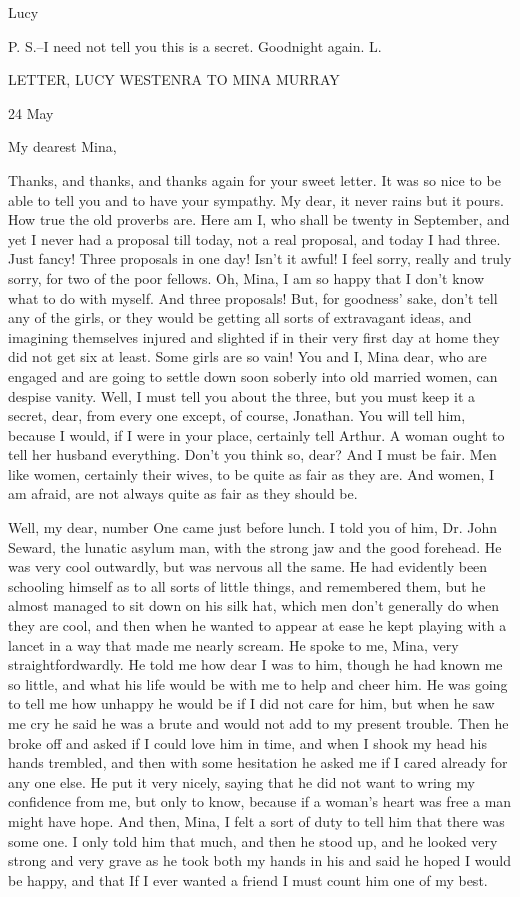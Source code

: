 Lucy 

P. S.--I need not tell you this is a secret. Goodnight again. L. 

LETTER, LUCY WESTENRA TO MINA MURRAY 

24 May 

My dearest Mina, 

Thanks, and thanks, and thanks again for your sweet letter. It was so nice to be able to tell you and to have your sympathy. My dear, it never rains but it pours. How true the old proverbs are. Here am I, who shall be twenty in September, and yet I never had a proposal till today, not a real proposal, and today I had three. Just fancy! Three proposals in one day! Isn't it awful! I feel sorry, really and truly sorry, for two of the poor fellows. Oh, Mina, I am so happy that I don't know what to do with myself. And three proposals! But, for goodness' sake, don't tell any of the girls, or they would be getting all sorts of extravagant ideas, and imagining themselves injured and slighted if in their very first day at home they did not get six at least. Some girls are so vain! You and I, Mina dear, who are engaged and are going to settle down soon soberly into old married women, can despise vanity. Well, I must tell you about the three, but you must keep it a secret, dear, from every one except, of course, Jonathan. You will tell him, because I would, if I were in your place, certainly tell Arthur. A woman ought to tell her husband everything. Don't you think so, dear? And I must be fair. Men like women, certainly their wives, to be quite as fair as they are. And women, I am afraid, are not always quite as fair as they should be. 

Well, my dear, number One came just before lunch. I told you of him, Dr. John Seward, the lunatic asylum man, with the strong jaw and the good forehead. He was very cool outwardly, but was nervous all the same. He had evidently been schooling himself as to all sorts of little things, and remembered them, but he almost managed to sit down on his silk hat, which men don't generally do when they are cool, and then when he wanted to appear at ease he kept playing with a lancet in a way that made me nearly scream. He spoke to me, Mina, very straightfordwardly. He told me how dear I was to him, though he had known me so little, and what his life would be with me to help and cheer him. He was going to tell me how unhappy he would be if I did not care for him, but when he saw me cry he said he was a brute and would not add to my present trouble. Then he broke off and asked if I could love him in time, and when I shook my head his hands trembled, and then with some hesitation he asked me if I cared already for any one else. He put it very nicely, saying that he did not want to wring my confidence from me, but only to know, because if a woman's heart was free a man might have hope. And then, Mina, I felt a sort of duty to tell him that there was some one. I only told him that much, and then he stood up, and he looked very strong and very grave as he took both my hands in his and said he hoped I would be happy, and that If I ever wanted a friend I must count him one of my best. 

